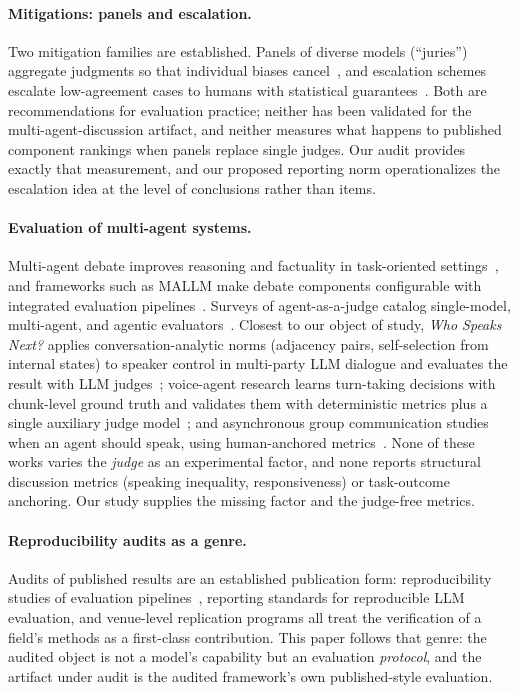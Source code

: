 \paragraph{Mitigations: panels and escalation.}
Two mitigation families are established. Panels of diverse models
(``juries'') aggregate judgments so that individual biases
cancel~\cite{verga2024juries}, and escalation schemes escalate
low-agreement cases to humans with statistical
guarantees~\cite{jung2024trust}. Both are recommendations for
evaluation practice; neither has been validated for the
multi-agent-discussion artifact, and neither measures what happens to
published component rankings when panels replace single judges. Our
audit provides exactly that measurement, and our proposed reporting norm
operationalizes the escalation idea at the level of conclusions rather
than items.

\paragraph{Evaluation of multi-agent systems.}
Multi-agent debate improves reasoning and factuality in task-oriented
settings~\cite{du2023debate}, and frameworks such as MALLM make debate
components configurable with integrated evaluation
pipelines~\cite{becker-etal-2025-mallm}. Surveys of agent-as-a-judge
catalog single-model, multi-agent, and agentic
evaluators~\cite{agentasjudge2025}. Closest to our object of study,
\emph{Who Speaks Next?} applies conversation-analytic norms
(adjacency pairs, self-selection from internal states) to speaker
control in multi-party LLM dialogue and evaluates the result with LLM
judges~\cite{whospeaks2024}; voice-agent research learns turn-taking
decisions with chunk-level ground truth and validates them with
deterministic metrics plus a single auxiliary judge
model~\cite{moderatorlm2026}; and asynchronous group communication
studies when an agent should speak, using human-anchored
metrics~\cite{eckhaus-etal-2025-time}. None of these works varies the
\emph{judge} as an experimental factor, and none reports structural
discussion metrics (speaking inequality, responsiveness) or
task-outcome anchoring. Our study supplies the missing factor and the
judge-free metrics.

\paragraph{Reproducibility audits as a genre.}
Audits of published results are an established publication form:
reproducibility studies of evaluation
pipelines~\cite{wang2024canyoutrust}, reporting standards for
reproducible LLM evaluation, and venue-level replication programs all
treat the verification of a field's methods as a first-class
contribution. This paper follows that genre: the audited object is not a
model's capability but an evaluation \emph{protocol}, and the artifact
under audit is the audited framework's own published-style evaluation.

